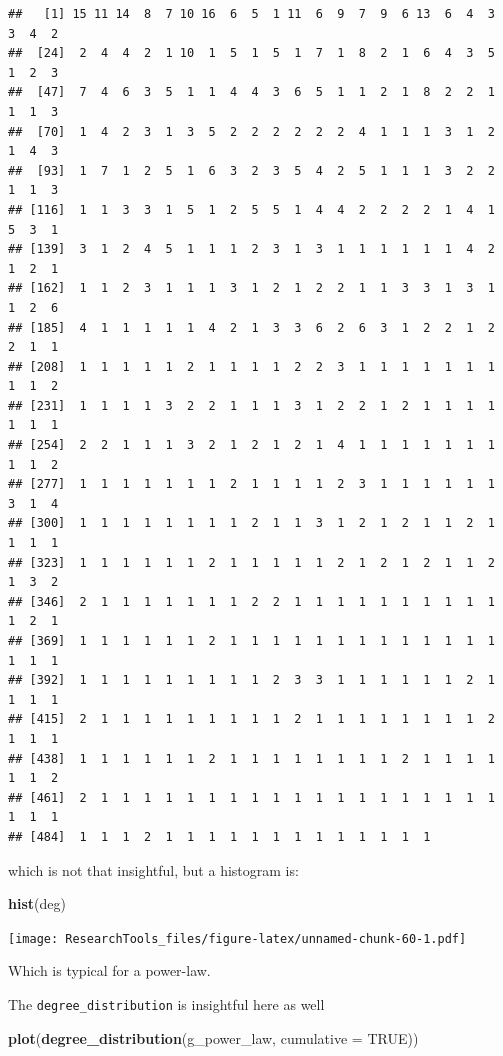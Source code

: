 \documentclass[]{article}
\newenvironment{Shaded}{\begin{snugshade}}{\end{snugshade}}
\newcommand{\KeywordTok}[1]{\textcolor[rgb]{0.13,0.29,0.53}{\textbf{{#1}}}}
\newcommand{\DataTypeTok}[1]{\textcolor[rgb]{0.13,0.29,0.53}{{#1}}}
\newcommand{\OtherTok}[1]{\textcolor[rgb]{0.56,0.35,0.01}{{#1}}}
\newcommand{\NormalTok}[1]{{#1}}
\begin{document}
\begin{verbatim}
##   [1] 15 11 14  8  7 10 16  6  5  1 11  6  9  7  9  6 13  6  4  3  3  4  2
##  [24]  2  4  4  2  1 10  1  5  1  5  1  7  1  8  2  1  6  4  3  5  1  2  3
##  [47]  7  4  6  3  5  1  1  4  4  3  6  5  1  1  2  1  8  2  2  1  1  1  3
##  [70]  1  4  2  3  1  3  5  2  2  2  2  2  2  4  1  1  1  3  1  2  1  4  3
##  [93]  1  7  1  2  5  1  6  3  2  3  5  4  2  5  1  1  1  3  2  2  1  1  3
## [116]  1  1  3  3  1  5  1  2  5  5  1  4  4  2  2  2  2  1  4  1  5  3  1
## [139]  3  1  2  4  5  1  1  1  2  3  1  3  1  1  1  1  1  1  4  2  1  2  1
## [162]  1  1  2  3  1  1  1  3  1  2  1  2  2  1  1  3  3  1  3  1  1  2  6
## [185]  4  1  1  1  1  1  4  2  1  3  3  6  2  6  3  1  2  2  1  2  2  1  1
## [208]  1  1  1  1  1  2  1  1  1  1  2  2  3  1  1  1  1  1  1  1  1  1  2
## [231]  1  1  1  1  3  2  2  1  1  1  3  1  2  2  1  2  1  1  1  1  1  1  1
## [254]  2  2  1  1  1  3  2  1  2  1  2  1  4  1  1  1  1  1  1  1  1  1  2
## [277]  1  1  1  1  1  1  1  2  1  1  1  1  2  3  1  1  1  1  1  1  3  1  4
## [300]  1  1  1  1  1  1  1  1  2  1  1  3  1  2  1  2  1  1  2  1  1  1  1
## [323]  1  1  1  1  1  1  2  1  1  1  1  1  2  1  2  1  2  1  1  2  1  3  2
## [346]  2  1  1  1  1  1  1  1  2  2  1  1  1  1  1  1  1  1  1  1  1  2  1
## [369]  1  1  1  1  1  1  2  1  1  1  1  1  1  1  1  1  1  1  1  1  1  1  1
## [392]  1  1  1  1  1  1  1  1  1  2  3  3  1  1  1  1  1  1  2  1  1  1  1
## [415]  2  1  1  1  1  1  1  1  1  1  2  1  1  1  1  1  1  1  1  2  1  1  1
## [438]  1  1  1  1  1  1  2  1  1  1  1  1  1  1  1  2  1  1  1  1  1  1  2
## [461]  2  1  1  1  1  1  1  1  1  1  1  1  1  1  1  1  1  1  1  1  1  1  1
## [484]  1  1  1  2  1  1  1  1  1  1  1  1  1  1  1  1  1
\end{verbatim}

which is not that insightful, but a histogram is:

\begin{Shaded}
\begin{Highlighting}[]
\KeywordTok{hist}\NormalTok{(deg)}
\end{Highlighting}
\end{Shaded}

\texttt{[image: ResearchTools\_files/figure-latex/unnamed-chunk-60-1.pdf]}

Which is typical for a power-law.

The \texttt{degree\_distribution} is insightful here as well

\begin{Shaded}
\begin{Highlighting}[]
\KeywordTok{plot}\NormalTok{(}\KeywordTok{degree_distribution}\NormalTok{(g_power_law, }\DataTypeTok{cumulative =} \OtherTok{TRUE}\NormalTok{))}
\end{Highlighting}
\end{Shaded}
\end{document}
